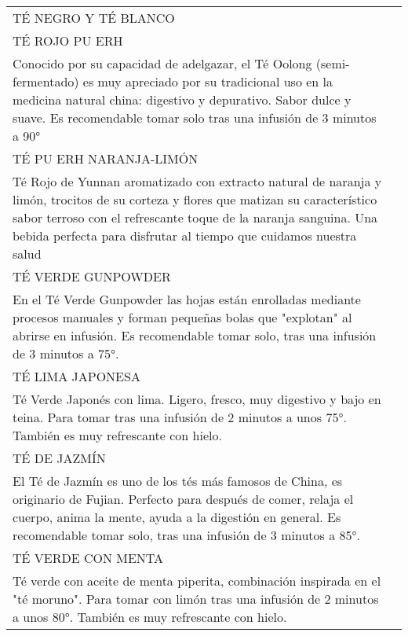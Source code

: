 \documentclass[8pt]{article}
\makeatletter
\newcommand*\ColText[1]{\textcolor{Goldenrod3}{#1}}
\newenvironment{Group}[1]
{\noindent\begin{tabular*}{\textwidth}{@{}p{1\linewidth}@{\extracolsep{\fill}}r@{}}
{\fontsize{24}{29}\selectfont\ColText{#1}}
              \\[0.8em]}
              {
\end{tabular*}}
\newcommand*\Entry[1]{%
    \sffamily#1}
\newcommand*\Expl[1]{%
    \hspace*{1em}\footnotesize #1}
\makeatother
\begin{document}
\begin{Group}{TÉ NEGRO Y TÉ BLANCO}
        \Entry{TÉ ROJO PU ERH} \\
        \Expl{Conocido por su capacidad de adelgazar, el Té Oolong (semi-fermentado) es muy apreciado por su tradicional uso en la medicina natural china: digestivo y depurativo. Sabor dulce y suave. Es recomendable tomar solo tras una infusión de 3 minutos a 90°} \\
        \Entry{TÉ PU ERH NARANJA-LIMÓN} \\
        \Expl{Té Rojo de Yunnan aromatizado con extracto natural de naranja y limón, trocitos de su corteza y flores que matizan su característico sabor terroso con el refrescante toque de la naranja sanguina. Una bebida perfecta para disfrutar al tiempo que cuidamos nuestra salud} \\
        \Entry{TÉ VERDE GUNPOWDER} \\
        \Expl{En el Té Verde Gunpowder las hojas están enrolladas mediante procesos manuales y forman pequeñas bolas que "explotan" al abrirse en infusión. Es recomendable tomar solo, tras una infusión de 3 minutos a 75°.} \\
        \Entry{TÉ LIMA JAPONESA} \\
        \Expl{Té Verde Japonés con lima. Ligero, fresco, muy digestivo y bajo en teina. Para tomar tras una infusión de 2 minutos a unos 75°. También es muy refrescante con hielo.} \\
        \Entry{TÉ DE JAZMÍN} \\
        \Expl{El Té de Jazmín es uno de los tés más famosos de China, es originario de Fujian. Perfecto para después de comer, relaja el cuerpo, anima la mente, ayuda a la digestión en general. Es recomendable tomar solo, tras una infusión de 3 minutos a 85°.} \\
        \Entry{TÉ VERDE CON MENTA} \\
        \Expl{Té verde con aceite de menta piperita, combinación inspirada en el "té moruno". Para tomar con limón tras una infusión de 2 minutos a unos 80°. También es muy refrescante con hielo.} \\
    \end{Group}
\end{document}
